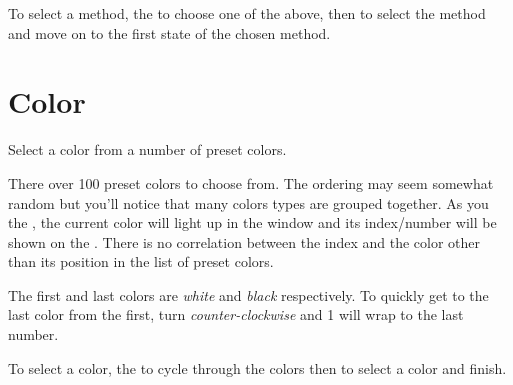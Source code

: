To select a method,  the  to choose one of the above, then 
to select the method and move on to the first state of the chosen method.


\section{Color} 

Select a color from a number of preset colors.

\par\medskip

There over \num{100} preset colors to choose from.  The ordering may seem
somewhat random but you'll notice that many colors types are grouped
together.  As you  the , the current color will light up 
in the  window and its index\slash number will be shown on the .
There is no correlation between the index and the color other than its
position in the list of preset colors.

\par\medskip

The first and last colors are \textit{white} and \textit{black} respectively.
To quickly get to the last color from the first, turn \textit{counter-clockwise}
and \num{1} will wrap to the last number.

\par\medskip

To select a color,  the  to cycle through the colors then
 to select a color and finish.


